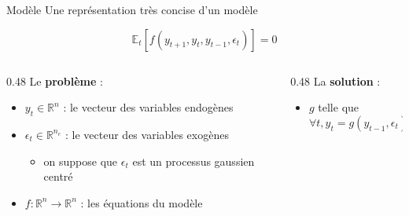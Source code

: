 \documentclass[
  ignorenonframetext,
]{beamer}
\providecommand{\tightlist}{%
  \setlength{\itemsep}{0pt}\setlength{\parskip}{0pt}}
\begin{document}
\begin{frame}{Modèle}
\label{moduxe8le}
Une représentation très concise d'un modèle

\[\mathbb{E}_t \left[ f(y_{t+1}, y_t, y_{t-1}, \epsilon_t) \right]= 0\]

\begin{columns}[T]
\begin{column}{0.48\linewidth}
Le \textbf{problème} :

\begin{itemize}
\tightlist
\item
  \(y_t\in\mathbb{R}^n\) : le vecteur des variables endogènes
\item
  \(\epsilon_t\in\mathbb{R}^{n_e}\) : le vecteur des variables exogènes

  \begin{itemize}
  \tightlist
  \item
    on suppose que \(\epsilon_t\) est un processus gaussien centré
  \end{itemize}
\item
  \(f: \mathbb{R}^n\rightarrow \mathbb{R}^n\) : les équations du modèle
\end{itemize}
\end{column}

\begin{column}{0.48\linewidth}
La \textbf{solution} :

\begin{itemize}
\tightlist
\item
  \(g\) telle que \[\forall t, y_t = g(y_{t-1},\epsilon_t)\]
\end{itemize}
\end{column}
\end{columns}

\end{frame}
\end{document}
